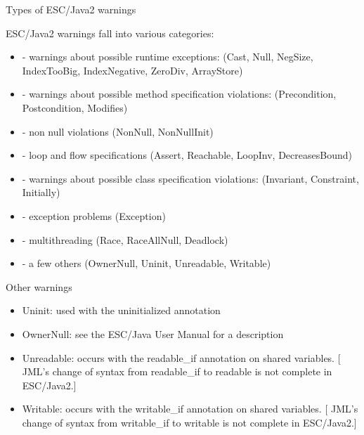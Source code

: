 \documentclass[
pdf,
nocolorBG,
slideColor,
cok,
]{prosper}
\begin{document}

\begin{slide}{Types of ESC/Java2 warnings}
\vspace*{-6ex}

ESC/Java2 warnings fall into various categories:
\begin{itemize}

\item[] - {\gray warnings about possible { runtime exceptions}:
(Cast, Null, NegSize, IndexTooBig, IndexNegative, ZeroDiv, ArrayStore)}

\item[] - {\gray warnings about possible method { specification violations}:
(Precondition, Postcondition, Modifies)}

\item[] - {\gray non null violations (NonNull, NonNullInit)}

\item[] - {\gray loop and flow specifications (Assert, Reachable, LoopInv, DecreasesBound)}

\item[] - { \gray warnings about possible class specification violations:
(Invariant, Constraint, Initially)}


\item[] - {\gray exception problems (Exception)}

\item[] - {\gray multithreading (Race, RaceAllNull, Deadlock)}

\item[] - a few others (OwnerNull, Uninit, Unreadable, Writable)

\end{itemize}
\end{slide}

\begin{slide}{Other warnings}

\vspace*{-6ex}
\begin{itemize}
\item {\knalblue Uninit}: used with the {\blue uninitialized} annotation
\item {\knalblue OwnerNull}: see the ESC/Java User Manual for a description
\item {\knalblue Unreadable}: occurs with the {\blue readable\_if} annotation on shared variables.
[ JML's change of syntax from {\blue readable\_if} to {\blue readable} is not complete in ESC/Java2.]
\item {\knalblue Writable}: occurs with the {\blue writable\_if} annotation on shared variables.
[ JML's change of syntax from {\blue writable\_if} to {\blue writable} is not complete in ESC/Java2.]
\end{itemize}
\end{slide}
\end{document}

